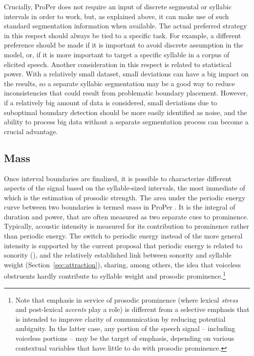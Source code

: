 Crucially, ProPer does not require an input of discrete segmental or syllabic intervals in order to work, but, as explained above, it can make use of such standard segmentation information when available. The actual preferred strategy in this respect should always be tied to a specific task. For example, a different preference should be made if it is important to avoid discrete assumption in the model, or, if it is more important to target a specific syllable in a corpus of elicited speech. Another consideration in this respect is related to statistical power. With a relatively small dataset, small deviations can have a big impact on the results, so a separate syllabic segmentation may be a good way to reduce inconsistencies that could result from problematic boundary placement. However, if a relatively big amount of data is considered, small deviations due to suboptimal boundary detection should be more easily identified as noise, and the ability to process big data without a separate segmentation process can become a crucial advantage.

\subsection{Mass}\label{sec:mass}

Once interval boundaries are finalized, it is possible to characterize different aspects of the signal based on the syllable-sized intervals,
the most immediate of which is the estimation of prosodic strength.
The area under the periodic energy curve between two boundaries is termed \emph{mass} in ProPer \citep{albert2022improved}. It is the integral of duration and power, that are often measured as two separate cues to prominence. Typically, acoustic intensity is measured for its contribution to prominence rather than periodic energy. The switch to periodic energy instead of the more general intensity is supported by 
the current proposal that periodic energy is related to sonority (), and the relatively established link between sonority and syllable weight (Section~\ref{sec:attraction}), 
sharing, among others, the idea that
voiceless obstruents hardly contribute to syllable weight and prosodic prominence.\footnote{Note that emphasis in service of prosodic prominence (where lexical \emph{stress} and post-lexical \emph{accents} play a role) is different from a selective emphasis that is intended to improve clarity of communication by reducing potential ambiguity. In the latter case, any portion of the speech signal -- including voiceless portions -- may be the target of emphasis, depending on various contextual variables that have little to do with prosodic prominence.}

